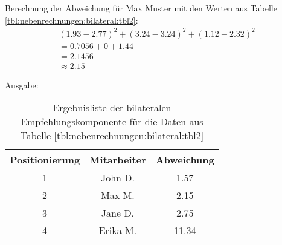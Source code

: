 Berechnung der Abweichung für Max Muster mit den Werten aus Tabelle \ref{tbl:nebenrechnungen:bilateral:tbl2}:
\begin{gather}
	\nonumber (1.93-2.77)^2 + (3.24-3.24)^2 + (1.12-2.32)^2\\
	\nonumber = 0.7056 + 0 + 1.44\\
	\nonumber = 2.1456\\
	\approx 2.15
	\label{frml:nebenrechnungen:bilateral:max}
\end{gather}

Ausgabe:
\begin{table}[h]
	\centering
	\begin{tabular}{c|c|c}
		Positionierung & Mitarbeiter & Abweichung\\
		\hline
		1 & John D.  & 1.57\\
		2 & Max M.   & 2.15\\
		3 & Jane D.  & 2.75\\
		4 & Erika M. & 11.34
	\end{tabular}
	\caption{Ergebnisliste der bilateralen Empfehlungskomponente für die Daten aus Tabelle \ref{tbl:nebenrechnungen:bilateral:tbl2}}
	\label{tbl:nebenrechnungen:bilateral:ausgabe}
\end{table}
